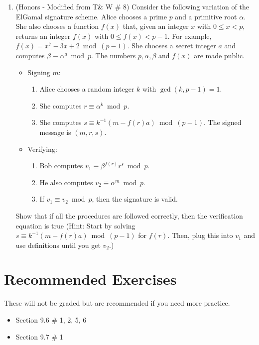 \documentclass[12pt]{amsart}
\theoremstyle{plain}
\theoremstyle{definition}
\begin{document}
\begin{enumerate}[1.]
    \item (Honors - Modified from T\& W \# 8) Consider the following variation of the ElGamal signature scheme.  Alice chooses a prime $p$ and a primitive root $\alpha$.  She also chooses a function $f(x)$ that, given an integer $x$ with $0 \leq x < p$, returns an integer $f(x)$ with $0 \leq f(x) < p-1$.  For example, $f(x) = x^7-3x+2 \bmod (p-1)$.  She chooses a secret integer $a$ and computes $\beta \equiv \alpha^a \bmod p$.  The numbers $p, \alpha, \beta$ and $f(x)$ are made public.
	\begin{itemize}
    	\item Signing $m$:
        	\begin{enumerate}[1.]
            	\item Alice chooses a random integer $k$ with $\gcd(k,p-1) = 1$.
                \item She computes $r \equiv \alpha^k \bmod p$.
                \item She computes $s \equiv k^{-1}(m-f(r)a) \bmod (p-1)$.  The signed message is $(m,r,s)$.
            \end{enumerate}
        \item Verifying:
        	\begin{enumerate}[1.]
            	\item Bob computes $v_1 \equiv \beta^{f(r)}r^s \bmod p$.
                \item He also computes $v_2 \equiv \alpha^m \bmod p$.
                \item If $v_1 \equiv v_2 \bmod p$, then the signature is valid.
            \end{enumerate}
    \end{itemize}
Show that if all the procedures are followed correctly, then the verification equation is true (Hint: Start by solving $s \equiv k^{-1}(m-f(r)a) \bmod (p-1)$ for $f(r)$.  Then, plug this into $v_1$ and use definitions until you get $v_2$.)
\begin{framed}
\vspace{3in}
\end{framed}
\end{enumerate}
	
    
\section{Recommended Exercises}
\noindent These will not be graded but are recommended if you need more practice.
\begin{itemize}
	\item Section 9.6 \# 1, 2, 5, 6
    \item Section 9.7 \# 1
\end{itemize}
\end{document}
